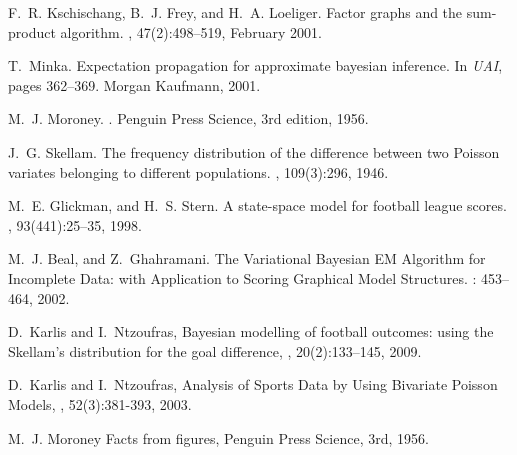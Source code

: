 \begin{thebibliography}{}
F.~R. Kschischang, B.~J. Frey, and H.~A. Loeliger.
\newblock Factor graphs and the sum-product algorithm.
, 47(2):498--519,
  February 2001.

T.~Minka.
\newblock Expectation propagation for approximate bayesian inference.
\newblock In {\em UAI}, pages
  362--369. Morgan Kaufmann, 2001.



M.~J. Moroney.
.
\newblock Penguin Press Science, 3rd edition, 1956.

J.~G. Skellam.
\newblock The frequency distribution of the difference between two
{P}oisson variates belonging to different populations.
, 109(3):296,
  1946.

M.~E. Glickman, and H.~S. Stern.
\newblock A state-space model for football league scores.
, 93(441):25--35,
  1998.

M.~J. Beal, and Z.~Ghahramani.
\newblock The Variational {B}ayesian {EM} Algorithm for Incomplete Data: with
	Application to Scoring Graphical Model Structures.
: 453--464,
2002.

D.~Karlis and I.~Ntzoufras,
\newblock Bayesian modelling of football outcomes: using the {S}kellam's distribution
	for the goal difference,
, 20(2):133--145, 2009.

D.~Karlis and I.~Ntzoufras,
\newblock Analysis of Sports Data by Using Bivariate {P}oisson Models,
, 52(3):381-393, 2003.

M.~J. Moroney
\newblock Facts from figures,
\newblock Penguin Press Science, 3rd, 1956.


\end{thebibliography}
